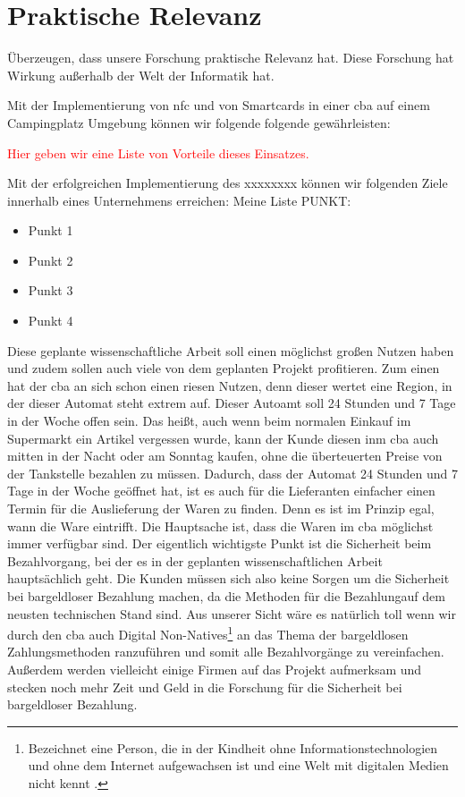 \section{Praktische Relevanz}

Überzeugen, dass unsere Forschung praktische Relevanz hat. Diese Forschung hat Wirkung außerhalb der
Welt der Informatik hat.

Mit der Implementierung von \acrshort{nfc} und von Smartcards in einer \acrlong{cba} auf einem Campingplatz Umgebung können
wir folgende folgende gewährleisten:

\textcolor{red}{Hier geben wir eine Liste von Vorteile dieses Einsatzes.}


Mit der erfolgreichen Implementierung des xxxxxxxx können wir folgenden Ziele innerhalb eines Unternehmens erreichen:
Meine Liste PUNKT:
\begin{itemize}
    \item Punkt 1
    \item Punkt 2
    \item Punkt 3
    \item Punkt 4
\end{itemize}


Diese geplante wissenschaftliche Arbeit soll einen möglichst großen Nutzen haben und zudem sollen auch viele von dem geplanten Projekt 
profitieren. 
Zum einen hat der \acrfull{cba} an sich schon einen riesen Nutzen, denn dieser wertet eine Region, in der dieser Automat steht 
extrem auf. Dieser Autoamt soll 24 Stunden und 7 Tage in der Woche offen sein. Das heißt, auch wenn beim normalen Einkauf im Supermarkt
ein Artikel vergessen wurde, kann der Kunde diesen inm \acrfull{cba} auch mitten in der Nacht oder am Sonntag kaufen, ohne die 
überteuerten Preise von der Tankstelle bezahlen zu müssen. 
Dadurch, dass der Automat 24 Stunden und 7 Tage in der Woche geöffnet hat, ist es auch für die Lieferanten einfacher einen Termin 
für die Auslieferung der Waren zu finden. Denn es ist im Prinzip egal, wann die Ware eintrifft. Die Hauptsache ist, dass die Waren im \acrfull{cba}
möglichst immer verfügbar sind.
Der eigentlich wichtigste Punkt ist die Sicherheit beim Bezahlvorgang, bei der es in der geplanten wissenschaftlichen Arbeit hauptsächlich geht. 
Die Kunden müssen sich also keine Sorgen um die Sicherheit bei bargeldloser Bezahlung machen, da die Methoden für die Bezahlungauf dem neusten 
technischen Stand sind. 
Aus unserer Sicht wäre es natürlich toll wenn wir durch den \acrfull{cba} auch Digital Non-Natives\footnote{Bezeichnet eine Person, die in der Kindheit
ohne Informationstechnologien und ohne dem Internet aufgewachsen ist und eine Welt mit digitalen Medien nicht kennt \cite{misc:MSND}.} an das Thema der 
bargeldlosen Zahlungsmethoden ranzuführen und somit alle Bezahlvorgänge zu vereinfachen.
Außerdem werden vielleicht einige Firmen auf das Projekt aufmerksam und stecken noch mehr Zeit und Geld in die Forschung für die Sicherheit bei 
bargeldloser Bezahlung.